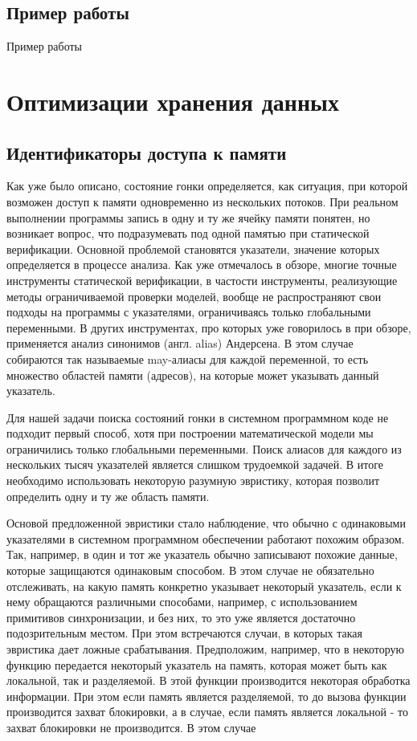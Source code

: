 \subsection{Пример работы} \label{sect_impl_example}
Пример работы 

\section{Оптимизации хранения данных} \label{sect_impl_storage}

\subsection{Идентификаторы доступа к памяти} \label{subsect_impl_identifiers}

Как уже было описано, состояние гонки определяется, как ситуация, при которой возможен доступ к памяти одновременно из нескольких потоков. 
При реальном выполнении программы запись в одну и ту же ячейку памяти понятен, но возникает вопрос, что подразумевать под одной памятью при статической верификации.
Основной проблемой становятся указатели, значение которых определяется в процессе анализа.
Как уже отмечалось в обзоре, многие точные инструменты статической верификации, в частости инструменты, реализующие методы ограничиваемой проверки моделей, вообще не распространяют свои подходы на программы с указателями, ограничиваясь только глобальными переменными.
В других инструментах, про которых уже говорилось в при обзоре, применяется анализ синонимов (англ. alias) Андерсена.
В этом случае собираются так называемые may-алиасы для каждой переменной, то есть множество областей памяти (адресов), на которые может указывать данный указатель.

Для нашей задачи поиска состояний гонки в системном программном коде не подходит первый способ, хотя при построении математической модели мы ограничились только глобальными переменными.
Поиск алиасов для каждого из нескольких тысяч указателей является слишком трудоемкой задачей.
В итоге необходимо использовать некоторую разумную эвристику, которая позволит определить одну и ту же область памяти. 

Основой предложенной эвристики стало наблюдение, что обычно с одинаковыми указателями в системном программном обеспечении работают похожим образом.
Так, например, в один и тот же указатель обычно записывают похожие данные, которые защищаются одинаковым способом.
В этом случае не обязательно отслеживать, на какую память конкретно указывает некоторый указатель, если к нему обращаются различными способами, например, с использованием примитивов синхронизации, и без них, то это уже является достаточно подозрительным местом.
При этом встречаются случаи, в которых такая эвристика дает ложные срабатывания. 
Предположим, например, что в некоторую функцию передается некоторый указатель на память, которая может быть как локальной, так и разделяемой. 
В этой функции производится некоторая обработка информации. При этом если память является разделяемой, то до вызова функции производится захват блокировки, а в случае, если память является локальной - то захват блокировки не производится.
В этом случае 


